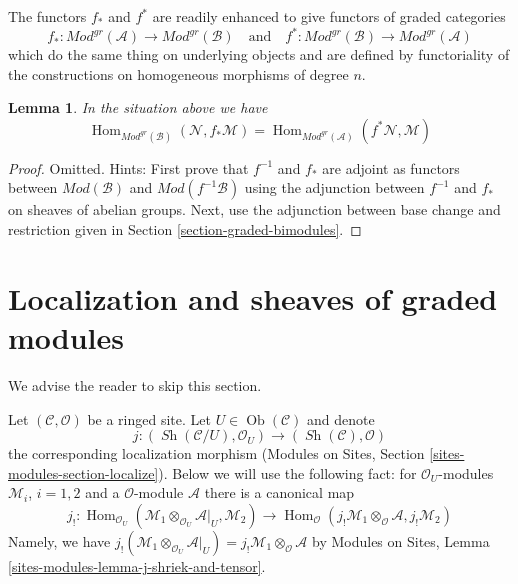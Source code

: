 \documentclass{stacks-project}
\theoremstyle{plain}
\newtheorem{lemma}[subsection]{Lemma}
\theoremstyle{definition}
\theoremstyle{remark}
\numberwithin{equation}{subsection}
\def\Hom{\mathop{\mathrm{Hom}}\nolimits}
\def\Ob{\mathop{\mathrm{Ob}}\nolimits}
\def\Sh{\mathop{\mathit{Sh}}\nolimits}
\begin{document}
\medskip\noindent
The functors $f_*$ and $f^*$ are readily enhanced to give
functors of graded categories
$$
f_* :
\textit{Mod}^{gr}(\mathcal{A})
\longrightarrow
\textit{Mod}^{gr}(\mathcal{B})
\quad\text{and}\quad
f^* :
\textit{Mod}^{gr}(\mathcal{B})
\longrightarrow
\textit{Mod}^{gr}(\mathcal{A})
$$
which do the same thing on underlying objects and are defined
by functoriality of the constructions on homogeneous morphisms
of degree $n$.

\begin{lemma}
\label{lemma-adjunction-push-pull-gr}
In the situation above we have
$$
\Hom_{\textit{Mod}^{gr}(\mathcal{B})}(
\mathcal{N}, f_*\mathcal{M}) =
\Hom_{\textit{Mod}^{gr}(\mathcal{A})}(
f^*\mathcal{N}, \mathcal{M})
$$
\end{lemma}

\begin{proof}
Omitted. Hints: First prove that $f^{-1}$ and $f_*$ are adjoint
as functors between $\textit{Mod}(\mathcal{B})$ and
$\textit{Mod}(f^{-1}\mathcal{B})$ using the adjunction between
$f^{-1}$ and $f_*$ on sheaves of abelian groups.
Next, use the adjunction between base change and restriction
given in Section \ref{section-graded-bimodules}.
\end{proof}





\section{Localization and sheaves of graded modules}
\label{section-localize-graded}

\noindent
We advise the reader to skip this section.

\medskip\noindent
Let $(\mathcal{C}, \mathcal{O})$ be a ringed site.
Let $U \in \Ob(\mathcal{C})$ and denote
$$
j :
(\Sh(\mathcal{C}/U), \mathcal{O}_U)
\longrightarrow
(\Sh(\mathcal{C}), \mathcal{O})
$$
the corresponding localization morphism
(Modules on Sites, Section \ref{sites-modules-section-localize}).
Below we will use the following fact: for $\mathcal{O}_U$-modules
$\mathcal{M}_i$, $i = 1, 2$ and a $\mathcal{O}$-module $\mathcal{A}$
there is a canonical map
$$
j_! :
\Hom_{\mathcal{O}_U}(
\mathcal{M}_1 \otimes_{\mathcal{O}_U} \mathcal{A}|_U, \mathcal{M}_2)
\longrightarrow
\Hom_\mathcal{O}(
j_!\mathcal{M}_1 \otimes_\mathcal{O} \mathcal{A}, j_!\mathcal{M}_2)
$$
Namely, we have
$j_!(\mathcal{M}_1 \otimes_{\mathcal{O}_U} \mathcal{A}|_U) =
j_!\mathcal{M}_1 \otimes_\mathcal{O} \mathcal{A}$ by
Modules on Sites, Lemma \ref{sites-modules-lemma-j-shriek-and-tensor}.
\end{document}
